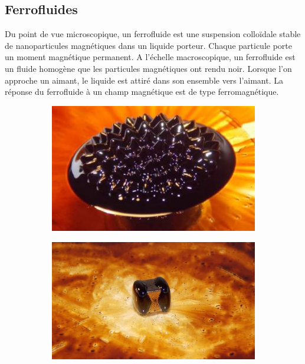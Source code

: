 \documentclass[10pt,a4paper]{article}
\begin{document}
\subsection{Ferrofluides}
Du point de vue microscopique, un ferrofluide est une suspension colloïdale stable de nanoparticules magnétiques dans un liquide porteur. Chaque particule porte un moment magnétique permanent. A l’échelle macroscopique, un ferrofluide est un fluide homogène que les particules magnétiques ont rendu noir. Lorsque l’on approche un aimant, le liquide est attiré dans son ensemble vers l’aimant. La réponse du ferrofluide à un champ magnétique est de type ferromagnétique.
\begin{figure}[!h]
    \centering
    \begin{subfigure}[b]{0.4\textwidth}
        \includegraphics[width=\textwidth]{images/goutte_ferro.jpg}
    \end{subfigure}
    \begin{subfigure}[b]{0.4\textwidth}
        \includegraphics[width=\textwidth]{images/aimment_ferro.jpg}

\end{subfigure}
\end{figure}
\end{document}
